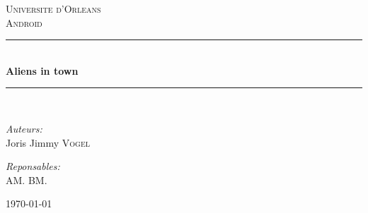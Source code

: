 \documentclass[pdftex,12pt,a4paper]{report}
\newcommand{\HRule} {\rule{\linewidth} {0.5mm}}
\begin{document}
\begin{titlepage}
	\begin{center}
		\textsc{\LARGE Universite d'Orleans }\\[1.5cm]
		\textsc{\LARGE Android}\\[0.5cm]

		\HRule \\[0.4cm]
		{\huge \bfseries Aliens in town}\\[0.3cm]
		\HRule \\[1.5cm]

		\begin{minipage}{0.4\textwidth}
 			\begin{flushleft} \large
  				\emph{Auteurs:}\\
  				Joris \textsc{}
  				Jimmy \textsc{Vogel}
			\end{flushleft}
		\end{minipage}
		\begin{minipage}{0.4\textwidth}
 			\begin{flushright}\large
 				\emph{Reponsables:}\\
 				A\textsc{M.}
 				B\textsc{M.}
 			\end{flushright}
		\end{minipage}
		\vfill
		{\large \today}
	\end{center}
\end{titlepage}

\tableofcontents




\clearpage
%
\clearpage




%

\end{document}
